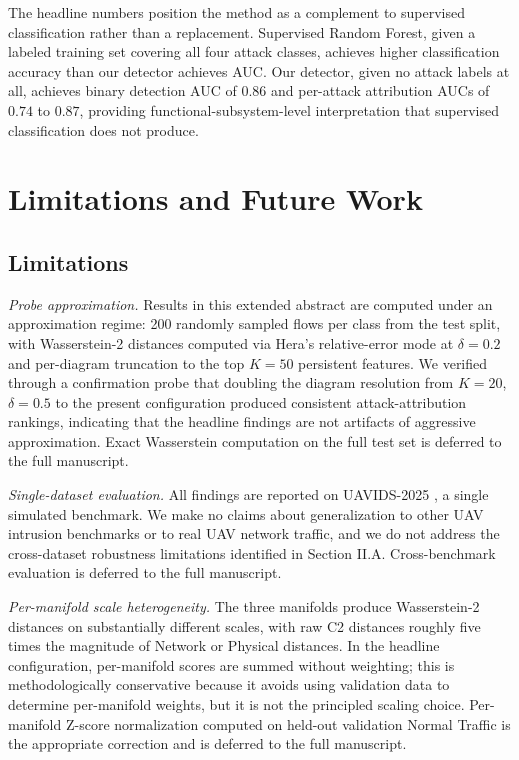 \documentclass[conf]{new-aiaa}
\begin{document}
The headline numbers position the method as a complement to supervised classification rather than a replacement. Supervised Random Forest, given a labeled training set covering all four attack classes, achieves higher classification accuracy than our detector achieves AUC. Our detector, given no attack labels at all, achieves binary detection AUC of $0.86$ and per-attack attribution AUCs of $0.74$ to $0.87$, providing functional-subsystem-level interpretation that supervised classification does not produce.

\section{Limitations and Future Work} %

\subsection{Limitations}

\textit{Probe approximation.} Results in this extended abstract are computed under an approximation regime: 200 randomly sampled flows per class from the test split, with Wasserstein-2 distances computed via Hera's relative-error mode at $\delta = 0.2$ and per-diagram truncation to the top $K = 50$ persistent features. We verified through a confirmation probe that doubling the diagram resolution from $K = 20$, $\delta = 0.5$ to the present configuration produced consistent attack-attribution rankings, indicating that the headline findings are not artifacts of aggressive approximation. Exact Wasserstein computation on the full test set is deferred to the full manuscript.

\textit{Single-dataset evaluation.} All findings are reported on UAVIDS-2025 \cite{Zeng}, a single simulated benchmark. We make no claims about generalization to other UAV intrusion benchmarks or to real UAV network traffic, and we do not address the cross-dataset robustness limitations identified in Section II.A. Cross-benchmark evaluation is deferred to the full manuscript.

\textit{Per-manifold scale heterogeneity.} The three manifolds produce Wasserstein-2 distances on substantially different scales, with raw C2 distances roughly five times the magnitude of Network or Physical distances. In the headline configuration, per-manifold scores are summed without weighting; this is methodologically conservative because it avoids using validation data to determine per-manifold weights, but it is not the principled scaling choice. Per-manifold Z-score normalization computed on held-out validation Normal Traffic is the appropriate correction and is deferred to the full manuscript.
\end{document}
